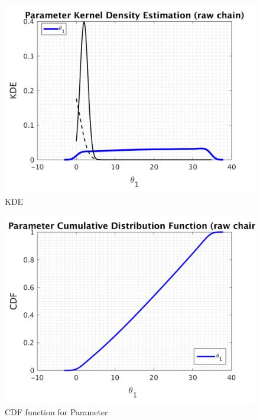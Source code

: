 \begin{figure}[h!]
  
  \centering
   \includegraphics[scale=0.75]{output_100/simple_ip_kde_raw}
   \caption{ KDE }
\end{figure}
%
\clearpage

\begin{figure}[h!]
  
  \centering
   \includegraphics[scale=0.75]{output_100/simple_ip_cdf_raw}
   \caption{CDF function for Parameter }
\end{figure}

\clearpage

